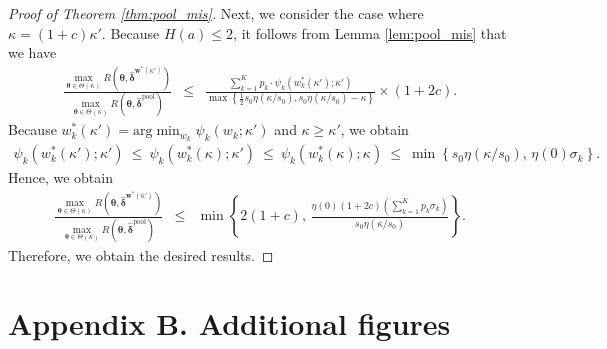 \documentclass[12pt,a4paper]{article}
\begin{document}
\begin{proof}[Proof of Theorem \ref{thm:pool_mis}]
Next, we consider the case where $\kappa =(1+c)\kappa'$. Because $H(a) \leq 2$, 
it follows from Lemma \ref{lem:pool_mis} that we have
\begin{eqnarray}
\frac{\max_{\bm{\theta} \in \Theta(\kappa)} R(\bm{\theta},\hat{\bm{\delta}}^{\bm{w}^{\ast}(\kappa')})}{\max_{\bm{\theta} \in \Theta(\kappa)} R(\bm{\theta},\hat{\bm{\delta}}^{\mathrm{pool}})} & \leq & \frac{\sum_{k=1}^K p_k \cdot \psi_k\left( w_k^{\ast}(\kappa') ;\kappa' \right)}{\max \left\{ \frac{1}{2} s_0 \eta ( \kappa / s_0 ), s_0 \eta ( \kappa / s_0 ) - \kappa \right\}} \times (1+2c). \nonumber 
\end{eqnarray}
Because $w_k^{\ast}(\kappa') = \text{arg} \min_{w_k} \psi_k\left( w_k ;\kappa' \right)$ and $\kappa \geq \kappa'$, we obtain
\begin{eqnarray*}
\psi_k\left( w_k^{\ast}(\kappa') ;\kappa' \right) \ \leq \ \psi_k\left( w_k^{\ast}(\kappa) ;\kappa' \right) \ \leq \ \psi_k\left( w_k^{\ast}(\kappa) ;\kappa \right) \ \leq \ \min \left\{ s_0 \eta(\kappa / s_0), \, \eta(0) \sigma_k \right\}.
\end{eqnarray*}
Hence, we obtain
\begin{eqnarray}
\frac{\max_{\bm{\theta} \in \Theta(\kappa)} R(\bm{\theta},\hat{\bm{\delta}}^{\bm{w}^{\ast}(\kappa')})}{\max_{\bm{\theta} \in \Theta(\kappa)} R(\bm{\theta},\hat{\bm{\delta}}^{\mathrm{pool}})} & \leq &  \min \left\{ 2(1+c), \, \frac{\eta(0) (1+2c) \left( \sum_{k=1}^K p_k \sigma_k \right)}{s_0 \eta(\kappa / s_0)} \right\}. \nonumber 
\end{eqnarray}
Therefore, we obtain the desired results.
\end{proof}


\section*{Appendix B. Additional figures}
\end{document}
